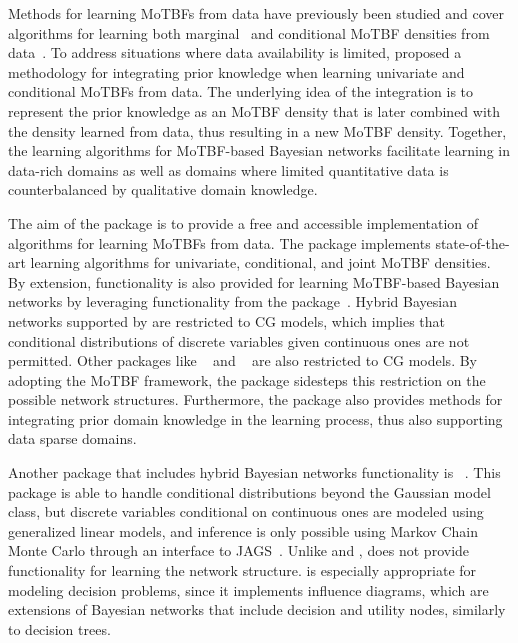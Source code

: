 Methods for learning MoTBFs from data have previously been studied and cover algorithms for learning both
marginal~\citep{Lan12b,Lan12} and conditional MoTBF densities from data~\citep{Lan09,Lan14,Per15b}. 
To address situations where data availability is limited, \cite{Per15} proposed a methodology for integrating prior
knowledge when  learning univariate and conditional MoTBFs from data. The underlying idea of the
integration is to represent the prior knowledge as an
MoTBF density that is later combined with the density learned from data, thus resulting in a new MoTBF density.
Together, the learning algorithms for MoTBF-based Bayesian networks facilitate learning in data-rich domains as well as domains where
limited quantitative data is counterbalanced by qualitative domain knowledge.  

The aim of the  package is to provide a free and accessible implementation of algorithms for learning
MoTBFs from data. The package implements state-of-the-art learning algorithms for univariate, conditional, and joint MoTBF
densities. By extension, functionality is also provided for learning MoTBF-based Bayesian networks by leveraging 
functionality from the  package~\citep{Scu10}. Hybrid Bayesian networks supported by 
are restricted to CG models, which implies that conditional distributions of discrete variables given continuous ones
are not permitted. Other packages like ~\citep{Boe03} and ~\citep{Kal12}
are also restricted to CG models. By adopting the MoTBF framework, the   package sidesteps this restriction
on the possible network structures.
Furthermore, the  package also provides methods for integrating prior
domain knowledge in the learning process, thus also supporting data sparse domains. 

Another package that includes hybrid Bayesian networks functionality is ~\citep{Dal19}.
This package is able to handle conditional distributions beyond the Gaussian model class, 
but discrete variables conditional on continuous ones are modeled using generalized linear models,
and inference is only possible using Markov Chain Monte Carlo through an interface to JAGS~\citep{Plu03}.
Unlike  and ,  does not provide functionality for learning the
network structure.  is especially appropriate for modeling decision problems, since it
implements influence diagrams, which are extensions of Bayesian networks that include decision and utility nodes,
similarly to decision trees.
 
